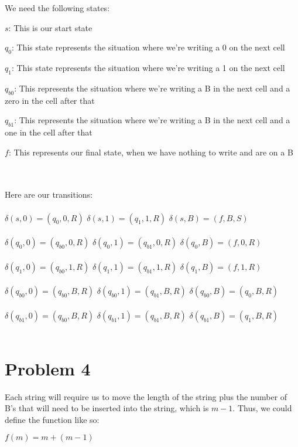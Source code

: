 \documentclass{article}%
\begin{document}
We need the following states:
\begin{itemize}
        \begin{item}
            $s$: This is our start state
        \end{item}

        \begin{item}
            $q_0$: This state represents the situation where we're writing a 0 on the next cell
        \end{item}

        \begin{item}
            $q_1$: This state represents the situation where we're writing a 1 on the next cell
        \end{item}

        \begin{item}
            $q_{b0}$: This represents the situation where we're writing a B in the next cell and a zero in the cell after that
        \end{item}

        \begin{item}
            $q_{b1}$: This represents the situation where we're writing a B in the next cell and a one in the cell after that
        \end{item}

        \begin{item}
            $f$: This represents our final state, when we have nothing to write and are on a B
        \end{item}
\end{itemize}\\
\\
Here are our transitions:\\
\\
$\delta(s, 0) = (q_0, 0, R)$
\hfill
$\delta(s, 1) = (q_1, 1, R)$
\hfill
$\delta(s, B) = (f, B, S)$\\
\\
$\delta(q_0, 0) = (q_{b0}, 0, R)$
\hfill
$\delta(q_0, 1) = (q_{b1}, 0, R)$
\hfill
$\delta(q_0, B) = (f, 0, R)$\\
\\
$\delta(q_1, 0) = (q_{b0}, 1, R)$
\hfill
$\delta(q_1, 1) = (q_{b1}, 1, R)$
\hfill
$\delta(q_1, B) = (f, 1, R)$\\
\\
$\delta(q_{b0}, 0) = (q_{b0}, B, R)$
\hfill
$\delta(q_{b0}, 1) = (q_{b1}, B, R)$
\hfill
$\delta(q_{b0}, B) = (q_{0}, B, R)$\\
\\
$\delta(q_{b1}, 0) = (q_{b0}, B, R)$
\hfill
$\delta(q_{b1}, 1) = (q_{b1}, B, R)$
\hfill
$\delta(q_{b1}, B) = (q_{1}, B, R)$\\
\\


\section*{Problem 4}

Each string will require us to move the length of the string plus the number of B's that will need to be inserted into the string, which is $m-1$. Thus, we could
define the function like so:

$f(m) = m + (m - 1)$
\end{document}
